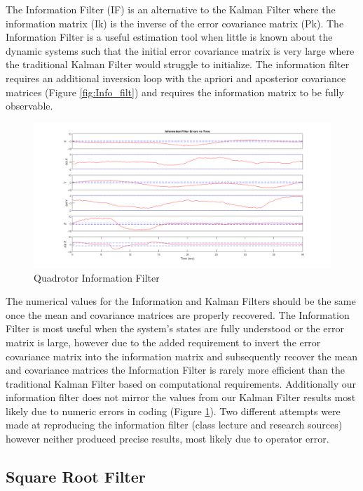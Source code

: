 \documentclass[12pt]{extarticle}
\begin{document}
{{The Information Filter (IF) is an alternative to the Kalman Filter where the information matrix (Ik) is the inverse of the error covariance matrix (Pk).  The Information Filter is a useful estimation tool when little is known about the dynamic systems such that the initial error covariance matrix is very large where the traditional Kalman Filter would struggle to initialize.  The information filter requires an additional inversion loop with the apriori and aposterior covariance matrices (Figure \ref{fig:Info_filt}) and requires the information matrix to be fully observable.

\begin{figure}[h!]
    \centering
    \includegraphics[width=\textwidth,clip=true,trim={0cm 0 0cm 0}]{Images/IF2.png}
    \caption{Quadrotor Information Filter}\label{fig:Info_filter_Results}
\end{figure}

The numerical values for the Information and Kalman Filters should be the same once the mean and covariance matrices are properly recovered.  The Information Filter is most useful when the system's states are fully understood or the error matrix is large, however due to the added requirement to invert the error covariance matrix into the information matrix and subsequently recover the mean and covariance matrices the Information Filter is rarely more efficient than the traditional Kalman Filter based on computational requirements.  Additionally our information filter does not mirror the values from our Kalman Filter results most likely due to numeric errors in coding (Figure \ref{fig:Info_filter_Results}).  Two different attempts were made at reproducing the information filter (class lecture and research sources) however neither produced precise results, most likely due to operator error.

}

\subsection{Square Root Filter}{


}}
\end{document}
